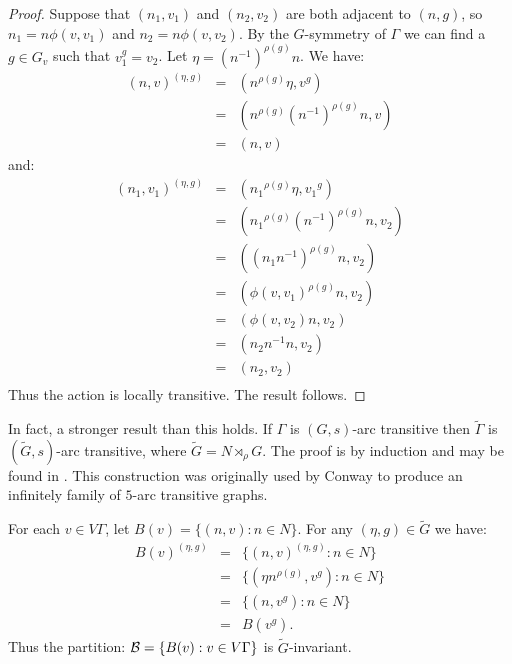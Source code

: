 \begin{proposition}
\begin{proof}
\hfill \break
Suppose that $(n_1,v_1)$ and $(n_2,v_2)$ are both adjacent to $(n,g)$,
so $n_1 = n \phi(v,v_1)$ and $n_2 = n \phi(v,v_2)$.
By the $G$-symmetry of $\Gamma$ we can find a $g \in G_v$ such that
$v_1^g = v_2$.
Let $\eta = (n^{-1})^{\rho(g)}n$. We have:
\begin{eqnarray*}
(n,v)^{(\eta,g)} & = & (n^{\rho(g)} \eta, v^g) \\
                 & = & (n^{\rho(g)} (n^{-1})^{\rho(g)}n, v) \\
		 & = & (n,v)
\end{eqnarray*}
and:
\begin{eqnarray*}
(n_1,v_1)^{(\eta,g)} & = & ({n_1}^{\rho(g)} \eta, {v_1}^g) \\
                 & = & ({n_1}^{\rho(g)} (n^{-1})^{\rho(g)}n, v_2) \\
                  & = & ({(n_1 n^{-1})}^{\rho(g)} n, v_2) \\
                   & = & (\phi(v,v_1)^{\rho(g)} n, v_2) \\
                    & = & (\phi(v,v_2) n, v_2) \\
                     & = & (n_2 n^{-1} n, v_2) \\
                      & = & (n_2, v_2) \\
\end{eqnarray*}
Thus the action is locally transitive. The result follows.	      
\end{proof}							
\end{proposition}
												 In fact, a stronger result than this holds.
												 If $\Gamma$ is $(G,s)$-arc transitive
												 then $\widetilde{\Gamma}$ is $(\widetilde{G},s)$-arc transitive,
												 where $\widetilde{G} = N \rtimes_\rho G$.
												 The proof is by induction and may be found in \cite{B1974}.
												 This construction was originally used by Conway
												 to produce an infinitely family of $5$-arc transitive graphs.

												 \hfill \break
												 For each $v \in V \Gamma$, let $B(v) = \{ (n,v) : n \in N \}$.
												 For any $(\eta, g) \in \widetilde{G}$ we have:
												 \begin{eqnarray*}
												 B(v)^{(\eta,g)} & = & \{ (n,v)^{(\eta,g)} : n \in N \} \\
												                 & = & \{ (\eta n^{\rho(g)},v^g) : n \in N \} \\
														                 & = & \{ (n, v^g) : n \in N \} \\
																                 & = & B(v^g).
																		 \end{eqnarray*}
																		 Thus the partition:
																		 $\mathcal{B} = \{ B(v) : v \in V \Gamma \}$
																		 is $\widetilde{G}$-invariant.

